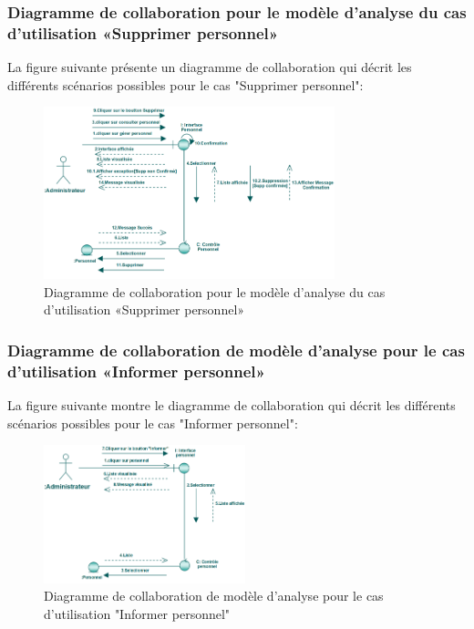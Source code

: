 \documentclass[12 pt ]{report}
\begin{document}
\subsubsection{Diagramme de collaboration pour le modèle d’analyse du cas d'utilisation                                       «Supprimer personnel»}
La figure suivante présente un diagramme de collaboration qui décrit les différents
scénarios possibles pour le cas "Supprimer personnel":
\begin{figure}[h]
 \begin{center}
\includegraphics[width= 12 cm ,height=  5cm]{colla_adm_supprimerpersonnel.PNG}
\caption{Diagramme de collaboration pour le modèle d’analyse du cas d'utilisation                                       «Supprimer personnel»}

\end{center}
\end{figure}
\subsubsection{Diagramme  de  collaboration  de  modèle  d'analyse  pour  le  cas  d'utilisation «Informer personnel»  }
La figure suivante montre le diagramme de collaboration qui décrit les différents
scénarios possibles pour le cas "Informer personnel":

\begin{figure}[h]
\begin{center}
\includegraphics[width= 12 cm , height =4cm]{colla_admin_informerpersonnel.png}
 \caption{Diagramme  de  collaboration  de  modèle  d'analyse  pour  le  cas  d'utilisation "Informer personnel"}
\end{center}
\end{figure}
\end{document}
